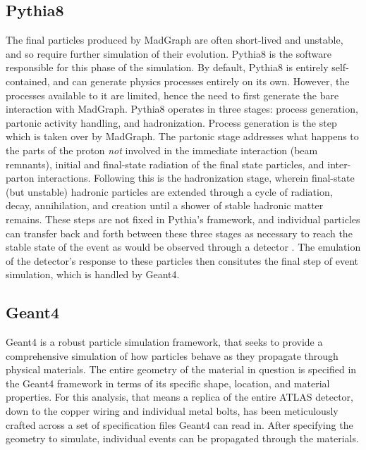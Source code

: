     \subsection{Pythia8}

    The final particles produced by MadGraph are often short-lived and unstable,
        and so require further simulation of their evolution.
    Pythia8 is the software responsible for this phase of the simulation. 
    By default, Pythia8 is entirely self-contained, and can generate physics processes entirely on its own.
    However, the processes available to it are limited,
        hence the need to first generate the bare interaction with MadGraph.
    Pythia8 operates in three stages: process generation, partonic activity handling, and hadronization.
    Process generation is the step which is taken over by MadGraph.
    The partonic stage addresses what happens to the parts of the proton \textit{not} involved in the immediate interaction (beam remnants),
        initial and final-state radiation of the final state particles, and inter-parton interactions.
    Following this is the hadronization stage, wherein final-state (but unstable)
        hadronic particles are extended through a cycle of radiation, decay, annihilation, and creation
        until a shower of stable hadronic matter remains.
    These steps are not fixed in Pythia's framework,
        and individual particles can transfer back and forth between these three stages
        as necessary to reach the stable state of the event as would be observed through a detector
        \cite{pythia}.
    The emulation of the detector's response to these particles then consitutes the final step of event simulation,
        which is handled by Geant4.

    \subsection{Geant4}

    Geant4 is a robust particle simulation framework,
        that seeks to provide a comprehensive simulation of how particles behave as they propagate through physical materials.
    The entire geometry of the material in question is specified in the Geant4 framework in terms of
        its specific shape, location, and material properties.
    For this analysis, that means a replica of the entire ATLAS detector,
        down to the copper wiring and individual metal bolts,
        has been meticulously crafted across a set of specification files Geant4 can read in.
    After specifying the geometry to simulate, individual events can be propagated through the materials.

